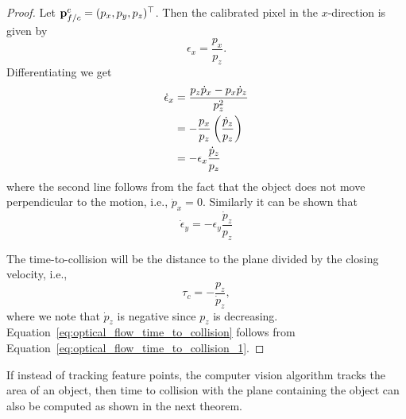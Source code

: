 \begin{proof}
	Let $\mathbf{p}_{f/c}^c = (p_x, p_y, p_z)^\top$.  Then the calibrated pixel in the $x$-direction is given by
	\[
	\epsilon_x = \frac{p_x}{p_z}.
	\]
	Differentiating we get
	\begin{align}
	\dot{\epsilon}_x &= \frac{p_z\dot{p}_x - p_x\dot{p}_z}{p_z^2} \notag \\
		&= -\frac{p_x}{p_z}\left(\frac{\dot{p}_z}{p_z}\right) \\
		&= -\epsilon_x \frac{\dot{p}_z}{p_z}
		\label{eq:optical_flow_time_to_collision_1}
	\end{align}
	where the second line follows from the fact that the object does not move perpendicular to the motion, i.e., $\dot{p}_x = 0$.  Similarly it can be shown that
	\[
	\dot{\epsilon}_y = -\epsilon_y \frac{\dot{p}_z}{p_z}
	\]
	
	The time-to-collision will be the distance to the plane divided by the closing velocity, i.e., 
	\[
	\tau_c = -\frac{p_z}{\dot{p}_z},
	\]
	where we note that $\dot{p}_z$ is negative since $p_z$ is decreasing.
	Equation~\eqref{eq:optical_flow_time_to_collision} follows from Equation~\eqref{eq:optical_flow_time_to_collision_1}.
\end{proof}

If instead of tracking feature points, the computer vision algorithm tracks the area of an object, then time to collision with the plane containing the object can also be computed as shown in the next theorem.

